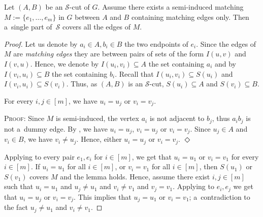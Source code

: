 \documentclass[a4paper,UKenglish,cleveref,hyperref,autoref]{lipics-v2021}
\newenvironment{proofofclaim}{\noindent \textsc{Proof:}}{\hfill$\Diamond$\medskip}
\begin{document}
\begin{lemma}\label{lem:matching-edges-are-clean}
  Let $(A, B)$ be an $\mathcal S$-cut of $G$.
  Assume there exists a semi-induced matching $M := \{e_1, \dots, e_m\}$ in $G$ between $A$ and $B$ containing matching edges only.
  Then a~single part of~$\mathcal S$ covers all the edges of $M$. 
\end{lemma}
\begin{proof}
  Let us denote by $a_i \in A, b_i \in B$ the two endpoints of $e_i$.
  Since the edges of $M$ are \emph{matching edges} they are between pairs of sets of the form $I(u, v)$ and $I(v, u)$.
  Hence, we denote by $I(u_i, v_i) \subseteq A$ the set containing $a_i$ and by $I(v_i, u_i) \subseteq B$ the set containing $b_i$.
  Recall that $I(u_i, v_i) \subseteq S(u_i)$ and  $I(v_i, u_i) \subseteq S(v_i)$.
  Thus, as $(A, B)$ is an $\mathcal S$-cut, $S(u_i) \subseteq A$ and $S(v_i) \subseteq B$.
  \begin{claim}\label{cl:proof-matching-edges-are-clean}
    For every $i,j\in [m]$, we have $u_i = u_j$ or $v_i = v_j$.
  \end{claim}
  \begin{proofofclaim}
    Since $M$ is semi-induced, the vertex $a_i$ is not adjacent to $b_j$, thus $a_ib_j$ is not a~dummy edge.
    By , we have $u_i = u_j$, $v_i = u_j$ or $v_i=v_j$.
    Since $u_j \in A$ and $v_i \in B$, we have $v_i \neq u_j$.
    Hence, either $u_i = u_j$ or $v_i = v_j$.
  \end{proofofclaim}

  Applying  to every pair $e_1, e_i$ for $i \in [m]$, we get that $u_i = u_1$ or $v_i = v_1$ for every $i\in [m]$.
  If $u_i = u_1$ for all $i\in [m]$, or $v_i = v_1$ for all $i\in [m]$, then $S(u_1)$ or $S(v_1)$ covers $M$ and the lemma holds.
  Hence, assume there exist $i,j\in [m]$ such that $u_i = u_1$ and $u_j\neq u_1$ and $v_i \neq v_1$ and $v_j = v_1$.
  Applying  to $e_i, e_j$ we get that $u_i = u_j$ or $v_i = v_j$.
  This implies that $u_j = u_1$ or $v_i = v_1$; a~contradiction to the fact $u_j \neq u_1$ and $v_i\neq v_1$.
\end{proof}
\end{document}
